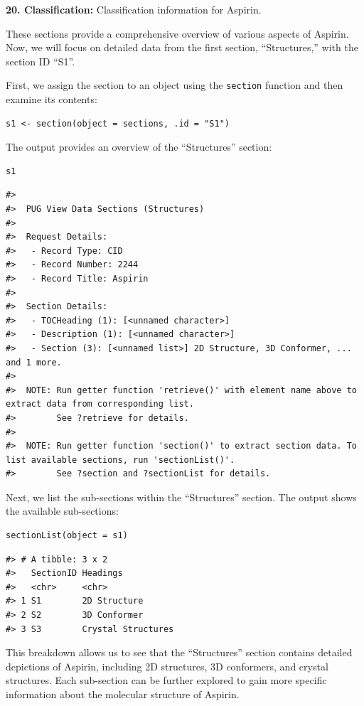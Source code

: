 \textbf{20. Classification:} Classification information for Aspirin.

These sections provide a comprehensive overview of various aspects of Aspirin. Now, we will focus on detailed data from the first section, ``Structures,'' with the section ID ``S1''.

First, we assign the section to an object using the \texttt{section} function and then examine its contents:

\begin{verbatim}
s1 <- section(object = sections, .id = "S1")
\end{verbatim}

The output provides an overview of the ``Structures'' section:

\begin{verbatim}
s1
\end{verbatim}

\begin{verbatim}
#> 
#>  PUG View Data Sections (Structures) 
#> 
#>  Request Details: 
#>   - Record Type: CID
#>   - Record Number: 2244
#>   - Record Title: Aspirin
#> 
#>  Section Details: 
#>   - TOCHeading (1): [<unnamed character>] 
#>   - Description (1): [<unnamed character>] 
#>   - Section (3): [<unnamed list>] 2D Structure, 3D Conformer, ... and 1 more.
#> 
#>  NOTE: Run getter function 'retrieve()' with element name above to extract data from corresponding list. 
#>        See ?retrieve for details. 
#> 
#>  NOTE: Run getter function 'section()' to extract section data. To list available sections, run 'sectionList()'. 
#>        See ?section and ?sectionList for details.
\end{verbatim}

Next, we list the sub-sections within the ``Structures'' section. The output shows the available sub-sections:

\begin{verbatim}
sectionList(object = s1)
\end{verbatim}

\begin{verbatim}
#> # A tibble: 3 x 2
#>   SectionID Headings          
#>   <chr>     <chr>             
#> 1 S1        2D Structure      
#> 2 S2        3D Conformer      
#> 3 S3        Crystal Structures
\end{verbatim}

This breakdown allows us to see that the ``Structures'' section contains detailed depictions of Aspirin, including 2D structures, 3D conformers, and crystal structures. Each sub-section can be further explored to gain more specific information about the molecular structure of Aspirin.

